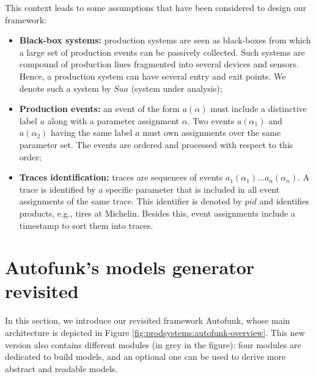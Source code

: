 This context leads to some assumptions that have been considered
to design our framework:

\begin{itemize}
    \item \textbf{Black-box systems:} production systems are seen as
        black-boxes from which a large set of production events can
        be passively collected. Such systems are compound of
        production lines fragmented into several devices and sensors.
        Hence, a production system can have several entry and exit
        points. We denote such a system by $\mathit{Sua}$ (system
        under analysis);

    \item \textbf{Production events:} an event of the form
        $a(\alpha)$ must include a distinctive label $a$ along with a
        parameter assignment $\alpha$. Two events $a(\alpha_1)$ and
        $a(\alpha_2)$ having the same label $a$ must own assignments
        over the same parameter set. The events are ordered and
        processed with respect to this order;

    \item \textbf{Traces identification:} traces are sequences of events
        $a_1(\alpha_1)$...$a_n(\alpha_n)$. A trace is identified by a
        specific parameter that is included in all event assignments
        of the same trace. This identifier is denoted by $pid$ and
        identifies products, e.g., tires at Michelin.  Besides this,
        event assignments include a timestamp to sort them into
        traces.
\end{itemize}


\section{Autofunk's models generator revisited}
\label{sec:modelinf:prodsystems:autofunk}

In this section, we introduce our revisited framework Autofunk,
whose main architecture is depicted in Figure
\ref{fig:prodsystems:autofunk-overview}. This new version also
contains different modules (in grey in the figure): four modules
are dedicated to build models, and an optional one can be used to
derive more abstract and readable models.

